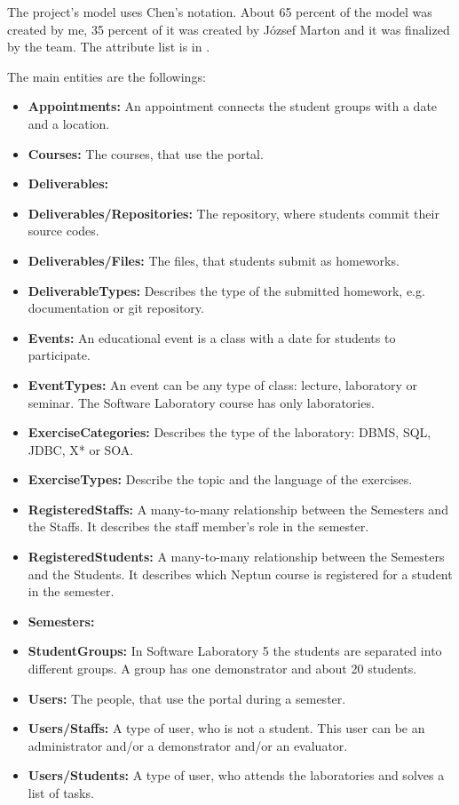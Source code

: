 The project's model uses Chen's notation. About 65 percent of the model was created by me, 35 percent of it was created by József Marton and it was finalized by the team. The attribute list is in .

 The main entities are the followings:

\begin{itemize}
	\item \textbf{Appointments:} An appointment connects the student groups with a date and a location.
	\item \textbf{Courses:} The courses, that use the portal.
	\item \textbf{Deliverables:} 
	\item \textbf{Deliverables/Repositories:} The repository, where students commit their source codes. 
	\item \textbf{Deliverables/Files:} The files, that students submit as homeworks. 
	\item \textbf{DeliverableTypes:} Describes the type of the submitted homework, e.g. documentation or git repository. 
	\item \textbf{Events:} An educational event is a class with a date for students	to participate.
	\item \textbf{EventTypes:} An event can be any type of class: lecture, laboratory or seminar. The Software Laboratory course has only laboratories.
	\item \textbf{ExerciseCategories:} Describes the type of the laboratory: DBMS, SQL, JDBC, X* or SOA.
	\item \textbf{ExerciseTypes:} Describe the topic and the language of the exercises. 
	\item \textbf{RegisteredStaffs:} A many-to-many relationship between the Semesters and the Staffs. It describes the staff member's role in the semester.
	\item \textbf{RegisteredStudents:} A many-to-many relationship between the Semesters and the Students. It describes which Neptun course is registered for a student in the semester.
	\item \textbf{Semesters:} 
	\item \textbf{StudentGroups:} In Software Laboratory 5 the students are separated into different groups. A group has one demonstrator and about 20 students.
	\item \textbf{Users:} The people, that use the portal during a semester.
	\item \textbf{Users/Staffs:} A type of user, who is not a student. This user can be an administrator and/or a demonstrator and/or an evaluator.
	\item \textbf{Users/Students:} A type of user, who attends the laboratories and solves a list of tasks.
\end{itemize}

